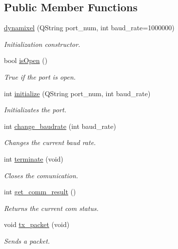 \subsection*{Public Member Functions}
\begin{DoxyCompactItemize}
\item 
\hyperlink{classdynamixel_a5d4fed957a4b2d1690c0fa72127f5cbf}{dynamixel} (Q\+String port\+\_\+num, int baud\+\_\+rate=1000000)
\begin{DoxyCompactList}\small\item\em Initialization constructor. \end{DoxyCompactList}\item 
bool \hyperlink{classdynamixel_a5ae4b2c6eb4c91f404f973ee8e6a1914}{is\+Open} ()
\begin{DoxyCompactList}\small\item\em True if the port is open. \end{DoxyCompactList}\item 
int \hyperlink{classdynamixel_a87960244d5846ae7583e37d2407eb61e}{initialize} (Q\+String port\+\_\+num, int baud\+\_\+rate)
\begin{DoxyCompactList}\small\item\em Initializates the port. \end{DoxyCompactList}\item 
int \hyperlink{classdynamixel_a7554c7889896e29e11a62027d89f3fdf}{change\+\_\+baudrate} (int baud\+\_\+rate)
\begin{DoxyCompactList}\small\item\em Changes the current baud rate. \end{DoxyCompactList}\item 
int \hyperlink{classdynamixel_a92ea074ed1c1a9cf29e039f8c425f01a}{terminate} (void)
\begin{DoxyCompactList}\small\item\em Closes the comunication. \end{DoxyCompactList}\item 
int \hyperlink{classdynamixel_ac8440d5d34ae3c4618b28fdbbd748edc}{get\+\_\+comm\+\_\+result} ()
\begin{DoxyCompactList}\small\item\em Returns the current com status. \end{DoxyCompactList}\item 
void \hyperlink{classdynamixel_a479187cd8940c16dd4374eb5be22b888}{tx\+\_\+packet} (void)
\begin{DoxyCompactList}\small\item\em Sends a packet. \end{DoxyCompactList}\item 

\end{DoxyCompactItemize}
